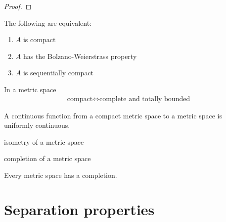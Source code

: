 \begin{proof}
\end{proof}

\begin{definition}

\end{definition}

\begin{theorem}[20.21]
  The following are equivalent:
  \begin{enumerate}
  \item $A$ is compact
  \item $A$ has the Bolzano-Weierstrass property
  \item $A$ is sequentially compact
  \end{enumerate}
\end{theorem}

\begin{definition}

\end{definition}

\begin{theorem}[20.23]
  In a metric space
  \begin{align*}
    \text{compact} \iff \text{complete and totally bounded}
  \end{align*}

\end{theorem}


\begin{theorem*}
  A continuous function from a compact metric space to a metric space is uniformly continuous.
\end{theorem*}


\begin{definition*}
  isometry of a metric space

  completion of a metric space
\end{definition*}

\begin{theorem*}
  Every metric space has a completion.
\end{theorem*}

\section*{Separation properties}

